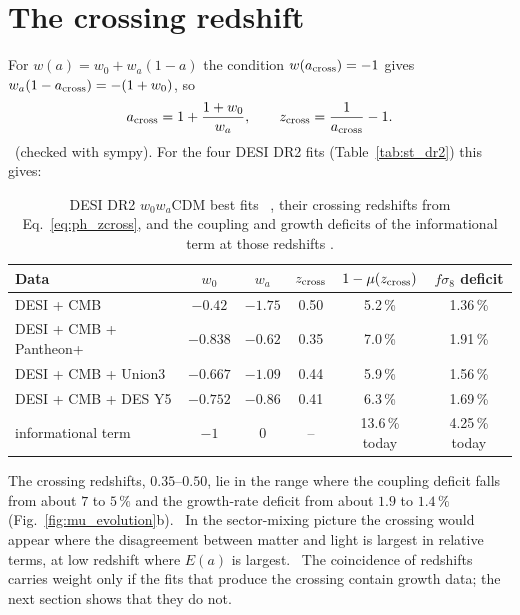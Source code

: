 \section{The crossing redshift}
For $w(a)=w_0+w_a(1-a)$ the condition $w(a_{\rm cross})=-1$ gives $w_a(1-a_{\rm cross})=-(1+w_0)$, so
\begin{equation}
a_{\rm cross}=1+\frac{1+w_0}{w_a},\qquad z_{\rm cross}=\frac1{a_{\rm cross}}-1 .
\label{eq:ph_zcross}\end{equation}
\derived\ (checked with sympy). For the four DESI DR2 fits (Table~\ref{tab:st_dr2}) this gives:
\begin{table}[htbp]\centering\small
\caption{DESI DR2 $w_0w_a$CDM best fits~\cite{DESI2025} \observed, their crossing redshifts from Eq.~\eqref{eq:ph_zcross}, and the coupling and growth deficits
of the informational term at those redshifts \calc.}\label{tab:ph_cross}
\begin{tabular}{lccccc}\toprule
Data & $w_0$ & $w_a$ & $z_{\rm cross}$ & $1-\mu(z_{\rm cross})$ & $f\sigma_8$ deficit\\\midrule
DESI + CMB & $-0.42$ & $-1.75$ & 0.50 & 5.2\,\% & 1.36\,\%\\
DESI + CMB + Pantheon+ & $-0.838$ & $-0.62$ & 0.35 & 7.0\,\% & 1.91\,\%\\
DESI + CMB + Union3 & $-0.667$ & $-1.09$ & 0.44 & 5.9\,\% & 1.56\,\%\\
DESI + CMB + DES Y5 & $-0.752$ & $-0.86$ & 0.41 & 6.3\,\% & 1.69\,\%\\\midrule
informational term & $-1$ & $0$ & -- & 13.6\,\% today & 4.25\,\% today\\\bottomrule
\end{tabular}\end{table}
The crossing redshifts, $0.35$--$0.50$, lie in the range where the coupling deficit falls from about $7$ to $5\,\%$ and the growth-rate deficit from
about $1.9$ to $1.4\,\%$ (Fig.~\ref{fig:mu_evolution}b). \calc\ In the sector-mixing picture the crossing would appear where the disagreement between
matter and light is largest in relative terms, at low redshift where $E(a)$ is largest. \conjecture\ The coincidence of redshifts carries weight only if
the fits that produce the crossing contain growth data; the next section shows that they do not.

